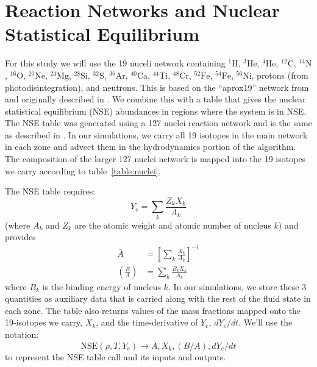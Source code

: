 \documentclass[times,modern]{aastex63}
\newcommand{\isot}[2]{$^{#2}\mathrm{#1}$}
\newcommand{\nse}[1]{{\mathrm{NSE}( #1 )}}
\begin{document}
\section{Reaction Networks and Nuclear Statistical Equilibrium}

For this study we will use the 19 nuceli network containing
\isot{H}{1}, \isot{He}{3}, \isot{He}{4}, \isot{C}{12}, \isot{N}{14},
\isot{O}{16}, \isot{Ne}{20}, \isot{Mg}{24}, \isot{Si}{28},
\isot{S}{32}, \isot{Ar}{36}, \isot{Ca}{40}, \isot{Ti}{44},
\isot{Cr}{48}, \isot{Fe}{52}, \isot{Fe}{54}, \isot{Ni}{56}, protons
(from photodisintegration), and neutrons.  This is based on the
``aprox19'' network from \cite{aprox19} and originally described in
\cite{Kepler}.  We combine this with a table that gives the nuclear
statistical equilibrium (NSE) abundances in regions where the system
is in NSE.  The NSE table was generated using a 127 nuclei reaction
network and is the same as described in \cite{ma:2013}.  In our
simulations, we carry all 19 isotopes in the main network in each zone
and advect them in the hydrodynamics portion of the algorithm.  The
composition of the larger 127 nuclei network is mapped into the 19
isotopes we carry according to table~\ref{table:nuclei}.

The NSE table requires:
\begin{equation}
  Y_e = \sum_k \frac{Z_k X_k}{A_k}
\end{equation}
(where $A_k$ and $Z_k$ are the atomic weight and atomic number of nucleus $k$) and provides
\begin{align}
\bar{A} &= \left [ \sum_k \frac{X_k}{A_k} \right ]^{-1} \\
\left (\frac{B}{A} \right ) &= \sum_k \frac{B_k X_k}{A_k}
\end{align}
where $B_k$ is the binding energy of nucleus $k$.  In our simulations,
we store these 3 quantities as auxiliary data that is carried along
with the rest of the fluid state in each zone.  The table also returns
values of the mass fractions mapped onto the 19-isotopes we carry, $X_k$, and the time-derivative of $Y_e$, $dY_e/dt$.
We'll use the notation:
\begin{equation}
\nse{\rho,T,Y_e} \rightarrow \bar{A}, X_k, (B/A), dY_e/dt
\end{equation}
to represent the NSE table call and its inputs and outputs.
\end{document}
